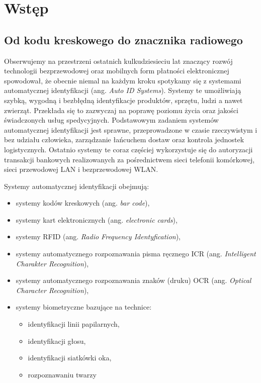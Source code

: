 
\singlespacing
\chapter{Wstęp}

\section{Od kodu kreskowego do znacznika radiowego}

Obserwujemy na przestrzeni ostatnich kulkudziesieciu lat znaczący rozwój technologii bezprzewodowej oraz mobilnych form płatności elektronicznej spowodował, że obecnie niemal na każdym kroku spotykamy się z systemami automatycznej identyfikacji (ang. \emph{Auto ID Systems}). Systemy te umożliwiają szybką, wygodną i bezbłędną identyfikacje produktów, sprzętu, ludzi a nawet zwierząt. Przekłada się to zazwyczaj na poprawę poziomu życia oraz jakości świadczonych usług spedycyjnych. Podstawowym zadaniem systemów automatycznej identyfikacji jest sprawne, przeprowadzone w czasie rzeczywistym i bez udziału człowieka, zarządzanie łańcuchem dostaw oraz kontrola jednostek logistycznych. Ostatnio systemy te coraz częściej wykorzystuje się do autoryzacji transakcji bankowych realizowanych za pośrednictwem sieci telefonii komórkowej, sieci przewodowej LAN i bezprzewodowej WLAN.


\noindent 
\newline Systemy automatycznej identyfikacji obejmują:
\begin{itemize}\setlength{\itemsep}{0pt}
    \item systemy kodów kreskowych (ang. \emph{bar code}),
    \item systemy kart elektronicznych (ang. \emph{electronic cards}),
    \item systemy RFID (ang. \emph{Radio Frequency Identyfication}),
    \item systemy automatycznego rozpoznawania pisma ręcznego ICR (ang. \emph{Intelligent Charakter Recognition}), 
    \item systemy automatycznego rozpoznawania znaków (druku) OCR (ang. \emph{Optical Character Recognition}),
    \item systemy biometryczne bazujące na technice:
	\begin{itemize}\setlength{\itemsep}{0pt}
		\item identyfikacji linii papilarnych,
		\item identyfikacji głosu,
		\item identyfikacji siatkówki oka,
		\item rozpoznawaniu twarzy
	\end{itemize}
\end{itemize}

